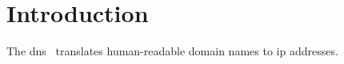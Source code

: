 \section{Introduction} \label{sec:introduction}
The \ac{dns}~\cite{RFC1034,RFC1035} translates human-readable 
domain names to \ac{ip} addresses.
